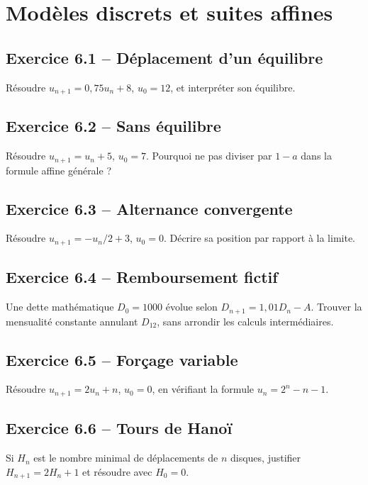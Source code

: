 \chapter{Modèles discrets et suites affines}
\section*{Exercice 6.1 -- Déplacement d'un équilibre}
Résoudre $u_{n+1}=0{,}75u_n+8$, $u_0=12$, et interpréter son équilibre.

\section*{Exercice 6.2 -- Sans équilibre}
Résoudre $u_{n+1}=u_n+5$, $u_0=7$. Pourquoi ne pas diviser par $1-a$ dans la formule affine générale ?

\section*{Exercice 6.3 -- Alternance convergente}
Résoudre $u_{n+1}=-u_n/2+3$, $u_0=0$. Décrire sa position par rapport à la limite.

\section*{Exercice 6.4 -- Remboursement fictif}
Une dette mathématique $D_0=1000$ évolue selon $D_{n+1}=1{,}01D_n-A$. Trouver la mensualité constante annulant $D_{12}$, sans arrondir les calculs intermédiaires.

\section*{Exercice 6.5 -- Forçage variable}
Résoudre $u_{n+1}=2u_n+n$, $u_0=0$, en vérifiant la formule $u_n=2^n-n-1$.

\section*{Exercice 6.6 -- Tours de Hanoï}
Si $H_n$ est le nombre minimal de déplacements de $n$ disques, justifier $H_{n+1}=2H_n+1$ et résoudre avec $H_0=0$.
